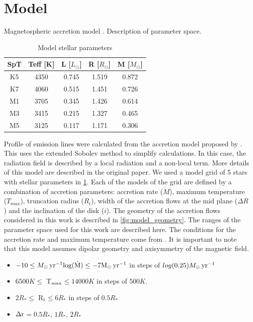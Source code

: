 \documentclass[twocolumn,linenumbers]{aastex631}
\newcommand{\Mdot}{{\dot{{M}}}}
\newcommand{\msunyr}{M_{\sun} \, \rm{ yr^{-1}}}
\newcommand{\ri}{R$_{\rm i}$}
\newcommand{\Dr}{$\Delta \rm r$}
\newcommand{\tmax}{T$_{\rm max}$}
\begin{document}
\section{Model} \label{Models}

Magnetospheric accretion model \citep{muzerolle2001}. Description of parameter space.

\begin{table}[]
\centering
\caption{Model stellar parameters}
\begin{tabular}{ccccc}
\hline
SpT & Teff {[}K{]} & L {[}$L_{\odot}${]} & R {[}$R_{\odot}${]} & M {[}$M_{\odot}${]} \\ \hline
K5  & 4350         & 0.745               & 1.519               & 0.872               \\
K7  & 4060         & 0.515               & 1.451               & 0.726               \\
M1  & 3705         & 0.345               & 1.426               & 0.614               \\
M3  & 3415         & 0.215               & 1.327               & 0.465               \\
M5  & 3125         & 0.117               & 1.171               & 0.306               \\ \hline
\end{tabular}
\label{table:parametros_modelos}
\end{table}

Profile of emission lines were calculated from the accretion model proposed by \citet{muzerolle2001}. This uses the extended Sobolev method to simplify calculations. In this case, the radiation field is described by a local radiation and a non-local term. More details of this model are described in the original paper. We used a model grid of 5 stars with stellar parameters in \ref{table:parametros_modelos}. Each of the models of the grid are defined by a combination of accretion parameters: accretion rate ($\dot{M}$), maximum temperature ($T_{max}$), truncation radius ($R_i$), width of the accretion flows at the mid plane ($\Delta R$) and the inclination of the disk ($i$). The geometry of the accretion flows considered in this work is described in \ref{fig:model_geometry}.  The ranges of the parameter space used for this work are described here. The conditions for the accretion rate and maximum temperature come from \citet{muzerolle2001}.  It is important to note that this model assumes dipolar geometry and axisymmetry of the magnetic field. 

\begin{itemize}
    \item $-10 \leq \msunyr log(\Mdot) \leq -7\msunyr$ in steps of $log(0.25) \msunyr$
    \item $6500 K \leq$ \tmax $\leq 14000 K$ in steps of $500 K$.
    \item $2 R_* \leq$ \ri $\leq 6 R_*$ in steps of $0.5 R_*$
    \item \Dr $= 0.5 R_*$, $1 R_*$, $2 R_*$
\end{itemize}
\end{document}
